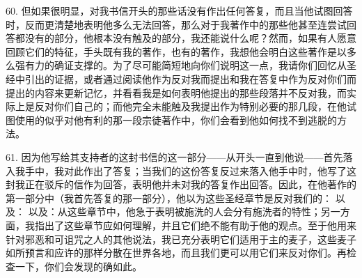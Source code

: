 60. 但如果很明显，对我书信开头的那些话没有作出任何答复，而且当他试图回答时，反而更清楚地表明他多么无法回答，那么对于我著作中的那些他甚至连尝试回答都没有的部分，他根本没有触及的部分，我还能说什么呢？然而，如果有人愿意回顾它们的特征，手头既有我的著作，也有的著作，我想他会明白这些著作是以多么强有力的确证支撑的。为了尽可能简短地向你们说明这一点，我请你们回忆从圣经中引出的证据，或者通过阅读他作为反对我而提出和我在答复中作为反对你们而提出的内容来更新记忆，并看看我是如何表明他提出的那些段落并不反对我，而实际上是反对你们自己的；而他完全未能触及我提出作为特别必要的那几段，在他试图使用的似乎对他有利的那一段宗徒著作中，你们会看到他如何找不到逃脱的方法。\par

61. 因为他写给其支持者的这封书信的这一部分——从开头一直到他说——首先落入我手中，我对此作出了答复；当我们的这份答复反过来落入他手中时，他写了这封我正在驳斥的信作为回答，表明他并未对我的答复作出回答。因此，在他著作的第一部分中（我首先答复的那一部分），他以为这些圣经章节是反对我们的： 以及： 以及：从这些章节中，他急于表明被施洗的人会分有施洗者的特性；另一方面，我指出了这些章节应如何理解，并且它们绝不能有助于他的观点。至于他用来针对邪恶和可诅咒之人的其他说法，我已充分表明它们适用于主的麦子，这些麦子如所预言和应许的那样分散在世界各地，而且我们更可以用它们来反对你们。再检查一下，你们会发现的确如此。\par

